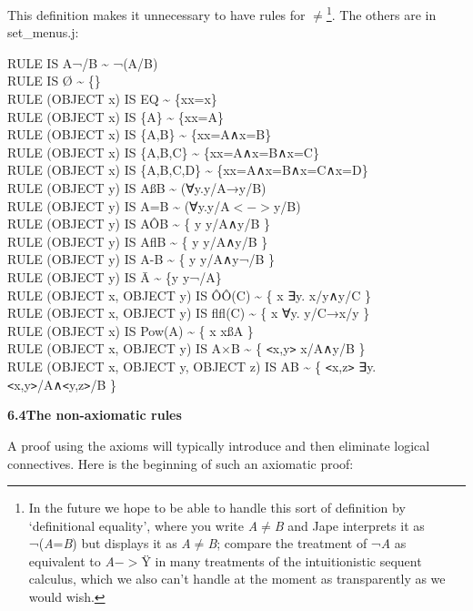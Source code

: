 This definition makes it unnecessary to have rules for \ensuremath{\neq}\footnote{In the future we hope to be able to handle this sort of definition by `definitional equality', where you write \textit{A}\ensuremath{\neq}\textit{B} and Jape interprets it as ¬(\textit{A}=\textit{B}) but displays it as \textit{A}\ensuremath{\neq}\textit{B}; compare the treatment of ¬\textit{A} as equivalent to \textit{A}$->$\"{Y} in many treatments of the intuitionistic sequent calculus, which we also can't handle at the moment as transparently as we would wish.}. The others are in set\_menus.j:

RULE IS A¬/B \~{} ¬(A/B)\\
RULE IS {\O} \~{} \{\}\\
RULE (OBJECT x) IS EQ \~{} \{x{\textbar}x=x\}\\
RULE (OBJECT x) IS \{A\} \~{} \{x{\textbar}x=A\}\\
RULE (OBJECT x) IS \{A,B\} \~{} \{x{\textbar}x=A∧x=B\}\\
RULE (OBJECT x) IS \{A,B,C\} \~{} \{x{\textbar}x=A∧x=B∧x=C\}\\
RULE (OBJECT x) IS \{A,B,C,D\} \~{} \{x{\textbar}x=A∧x=B∧x=C∧x=D\}\\
RULE (OBJECT y) IS A{\ss}B \~{} (∀y.y/A→y/B)\\
RULE (OBJECT y) IS A=B \~{} (∀y.y/A$<->$y/B)\\
RULE (OBJECT y) IS A\^{O}B \~{} \{ y {\textbar} y/A∧y/B \}\\
RULE (OBJECT y) IS AflB \~{} \{ y {\textbar} y/A∧y/B \}\\
RULE (OBJECT y) IS A-B \~{} \{ y {\textbar} y/A∧y¬/B \}\\
RULE (OBJECT y) IS A\={} \~{} \{y {\textbar} y¬/A\}\\
RULE (OBJECT x, OBJECT y) IS \^{O}\^{O}(C) \~{} \{ x {\textbar} ∃y. x/y∧y/C \}\\
RULE (OBJECT x, OBJECT y) IS flfl(C) \~{} \{ x {\textbar} ∀y. y/C→x/y \}\\
RULE (OBJECT x) IS Pow(A) \~{} \{ x {\textbar} x{\ss}A \}\\
RULE (OBJECT x, OBJECT y) IS A$\times$B \~{} \{ \texttt{<}x,y\texttt{>} {\textbar} x/A∧y/B \}\\
RULE (OBJECT x, OBJECT y, OBJECT z) IS A{\textbullet}B \~{} \{ \texttt{<}x,z\texttt{>} {\textbar} ∃y.\texttt{<}x,y\texttt{>}/A∧\texttt{<}y,z\texttt{>}/B \}


\textbf{6.4\tab The non-axiomatic rules}


A proof using the axioms will typically introduce and then eliminate logical connectives. Here is the beginning of such an axiomatic proof:

